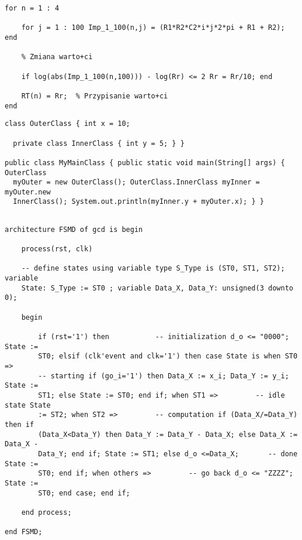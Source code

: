 \begin{lstlisting}[caption={Przyk+adowy listing programu Matlab}]
for n = 1 : 4
    
    for j = 1 : 100 Imp_1_100(n,j) = (R1*R2*C2*i*j*2*pi + R1 + R2); end
    
    % Zmiana warto+ci  
    
    if log(abs(Imp_1_100(n,100))) - log(Rr) <= 2 Rr = Rr/10; end
    
    RT(n) = Rr;  % Przypisanie warto+ci
end
\end{lstlisting}


\lstset{style=java}

\begin{lstlisting}[caption={Przyk+adowy listing w j+zyku Java},label=javovy]
class OuterClass { int x = 10;

  private class InnerClass { int y = 5; } }

public class MyMainClass { public static void main(String[] args) { OuterClass
  myOuter = new OuterClass(); OuterClass.InnerClass myInner = myOuter.new
  InnerClass(); System.out.println(myInner.y + myOuter.x); } }
\end{lstlisting}

\newpage





\lstset{style=vhdl}

\begin{lstlisting}[caption={Przyk+adowy listing w j+zyku VHDL}]

architecture FSMD of gcd is begin

    process(rst, clk)

    -- define states using variable type S_Type is (ST0, ST1, ST2); variable
    State: S_Type := ST0 ; variable Data_X, Data_Y: unsigned(3 downto 0);
	
    begin

        if (rst='1') then		    -- initialization d_o <= "0000"; State :=
	    ST0; elsif (clk'event and clk='1') then case State is when ST0 =>
	    -- starting if (go_i='1') then Data_X := x_i; Data_Y := y_i; State :=
	    ST1; else State := ST0; end if; when ST1 =>		    -- idle state State
	    := ST2; when ST2 =>		    -- computation if (Data_X/=Data_Y) then if
	    (Data_X<Data_Y) then Data_Y := Data_Y - Data_X; else Data_X := Data_X -
	    Data_Y; end if; State := ST1; else d_o <=Data_X;       -- done State :=
	    ST0; end if; when others =>		    -- go back d_o <= "ZZZZ"; State :=
	    ST0; end case; end if;
    
    end process;		

end FSMD;

\end{lstlisting}


